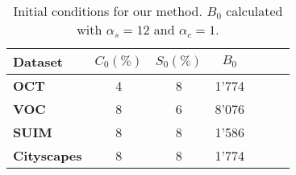\begin{table}[h]
\centering
\begin{tabular}{lcccccc}
\toprule
\textbf{Dataset} & $C_0 (\%)$ & $S_0 (\%)$ & $B_0$ \\ \midrule
\textbf{OCT} & 4 & 8 & 1'774 \\
\textbf{VOC} & 8 & 6 & 8'076 \\
\textbf{SUIM} & 8 & 8 & 1'586 \\ 
\textbf{Cityscapes} & 8 & 8 & 1'774  \\ \bottomrule
\end{tabular}
\caption{Initial conditions for our method. $B_0$ calculated with $\alpha_s = 12$ and $\alpha_c = 1$.}
\label{tab:configurations_gp}
\end{table}
